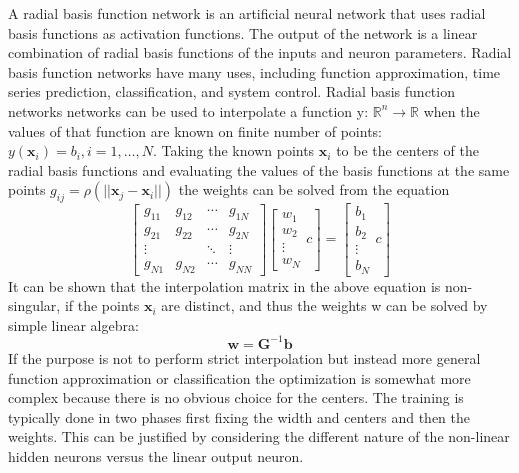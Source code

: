 \documentclass[preprint]{aastex}
\begin{document}
A radial basis function network is an artificial neural network that uses radial basis functions as activation functions. The output of the network is a linear combination of radial basis functions of the inputs and neuron parameters. Radial basis function networks have many uses, including function approximation, time series prediction, classification, and system control. Radial basis function networks networks can be used to interpolate a function y: $\mathbb{R}^n \to \mathbb{R}$ when the values of that function are known on finite number of points: $y(\mathbf x_i) = b_i, i=1, \ldots, N$. Taking the known points $\mathbf x_i$ to be the centers of the radial basis functions and evaluating the values of the basis functions at the same points $g_{ij} = \rho(|| \mathbf x_j - \mathbf x_i ||)$ the weights can be solved from the equation
$$
\left[ \begin{array}{cccc} 
g_{11} & g_{12} & \cdots & g_{1N} \\
g_{21} & g_{22} & \cdots & g_{2N} \\
\vdots &        & \ddots & \vdots \\
g_{N1} & g_{N2} & \cdots & g_{NN}
\end{array}\right] 
\left[ \begin{array}{cccc}
w_1 \\
w_2 \\
\vdots \\
w_N
\end{array}{c} \right] = \left[ \begin{array}{c}
b_1 \\
b_2 \\
\vdots \\
b_N
\end{array}{c} \right]$$
It can be shown that the interpolation matrix in the above equation is non-singular, if the points $\mathbf x_i$ are distinct, and thus the weights w can be solved by simple linear algebra:
$$\mathbf{w} = \mathbf{G}^{-1} \mathbf{b}$$
If the purpose is not to perform strict interpolation but instead more general function approximation or classification the optimization is somewhat more complex because there is no obvious choice for the centers. The training is typically done in two phases first fixing the width and centers and then the weights. This can be justified by considering the different nature of the non-linear hidden neurons versus the linear output neuron.    
    
\end{document}

